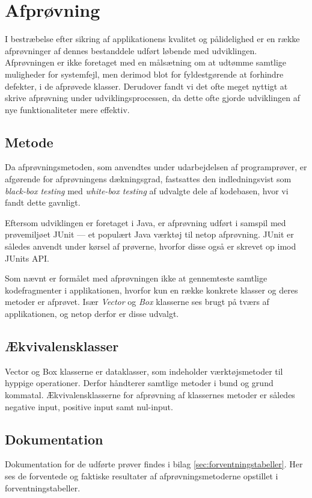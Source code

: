 \section{Afprøvning}
\label{sec:afproevning}
I bestræbelse efter sikring af applikationens kvalitet og pålidelighed er en række afprøvninger af dennes bestanddele udført løbende med udviklingen. Afprøvningen er ikke foretaget med en målsætning om at udtømme samtlige muligheder for systemfejl, men derimod blot for fyldestgørende at forhindre defekter, i de afprøvede klasser. Derudover fandt vi det ofte meget nyttigt at skrive afprøvning under udviklingsprocessen, da dette ofte gjorde udviklingen af nye funktionaliteter mere effektiv.

\subsection{Metode}
\label{subsec:metode}
Da afprøvningsmetoden, som anvendtes under udarbejdelsen af programprøver, er afgørende for afprøvningens dækningsgrad, fastsattes den indledningsvist som \emph{black-box testing} med \emph{white-box testing} af udvalgte dele af kodebasen, hvor vi fandt dette gavnligt. 

Eftersom udviklingen er foretaget i Java, er afprøvning udført i samspil med prøvemiljøet JUnit --- et populært Java værktøj til netop afprøvning. JUnit er således anvendt under kørsel af prøverne, hvorfor disse også er skrevet op imod JUnits API.

Som nævnt er formålet med afprøvningen ikke at gennemteste samtlige kodefragmenter i applikationen, hvorfor kun en række konkrete klasser og deres metoder er afprøvet. Især \emph{Vector} og \emph{Box} klasserne ses brugt på tværs af applikationen, og netop derfor er disse udvalgt.

\subsection{Ækvivalensklasser}
\label{subsec:aekvivalensklasser}
Vector og Box klasserne er dataklasser, som indeholder værktøjsmetoder til hyppige operationer. Derfor håndterer samtlige metoder i bund og grund kommatal. Ækvivalensklasserne for afprøvning af klassernes metoder er således negative input, positive input samt nul-input.

\subsection{Dokumentation}
\label{subsec:dokumentation}
Dokumentation for de udførte prøver findes i bilag \ref{sec:forventningstabeller}. Her ses de forventede og faktiske resultater af afprøvningsmetoderne opstillet i forventningstabeller.